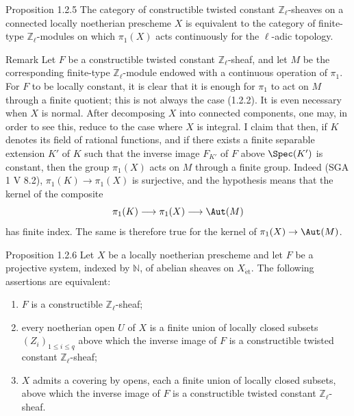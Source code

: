 \begin{statement}{Proposition 1.2.5}
The category of constructible twisted constant \(\mathbb Z_\ell\)-sheaves on a connected locally noetherian prescheme \(X\) is equivalent to the category of finite-type \(\mathbb Z_\ell\)-modules on which \(\pi_1(X)\) acts continuously for the \(\ell\)-adic topology.
\end{statement}

\begin{statement}{Remark}
Let \(F\) be a constructible twisted constant \(\mathbb Z_\ell\)-sheaf, and let \(M\) be the corresponding finite-type \(\mathbb Z_\ell\)-module endowed with a continuous operation of \(\pi_1\). For \(F\) to be locally constant, it is clear that it is enough for \(\pi_1\) to act on \(M\) through a finite quotient; this is not always the case (1.2.2). It is even necessary when \(X\) is normal. After decomposing \(X\) into connected components, one may, in order to see this, reduce to the case where \(X\) is integral. I claim that then, if \(K\) denotes its field of rational functions, and if there exists a finite separable extension \(K'\) of \(K\) such that the inverse image \(F_{K'}\) of \(F\) above \(\Spec(K')\) is constant, then the group \(\pi_1(X)\) acts on \(M\) through a finite group. Indeed (SGA 1 V 8.2), \(\pi_1(K)\to\pi_1(X)\) is surjective, and the hypothesis means that the kernel of the composite
\[
\pi_1(K)\longrightarrow \pi_1(X)\longrightarrow \Aut(M)
\]
has finite index. The same is therefore true for the kernel of \(\pi_1(X)\to\Aut(M)\).
\end{statement}

\begin{statement}{Proposition 1.2.6}
Let \(X\) be a locally noetherian prescheme and let \(F\) be a projective system, indexed by \(\mathbb N\), of abelian sheaves on \(X_{\mathrm{\acute et}}\). The following assertions are equivalent:
\begin{enumerate}[label=(\roman*)]
\item \(F\) is a constructible \(\mathbb Z_\ell\)-sheaf;
\item every noetherian open \(U\) of \(X\) is a finite union of locally closed subsets \((Z_i)_{1\le i\le q}\) above which the inverse image of \(F\) is a constructible twisted constant \(\mathbb Z_\ell\)-sheaf;
\item \(X\) admits a covering by opens, each a finite union of locally closed subsets, above which the inverse image of \(F\) is a constructible twisted constant \(\mathbb Z_\ell\)-sheaf.
\end{enumerate}
\end{statement}

